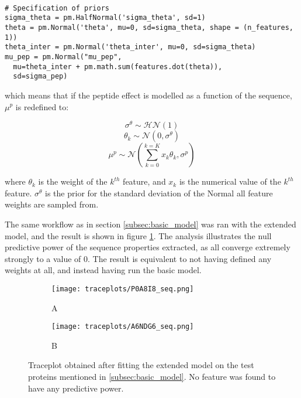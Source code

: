 \begin{verbatim}

# Specification of priors
sigma_theta = pm.HalfNormal('sigma_theta', sd=1)
theta = pm.Normal('theta', mu=0, sd=sigma_theta, shape = (n_features, 1))
theta_inter = pm.Normal('theta_inter', mu=0, sd=sigma_theta)
mu_pep = pm.Normal("mu_pep",
  mu=theta_inter + pm.math.sum(features.dot(theta)),
  sd=sigma_pep)   
\end{verbatim}

which means that if the peptide effect is modelled as a function of the sequence, $\mu^p$ is redefined to:

        
\begin{equation}
\nonumber \sigma^{\theta} \sim \mathcal{HN}(1)
\end{equation}
\begin{equation}
\nonumber \theta_k \sim \mathcal{N}(0, \sigma^{\theta})
\end{equation}
\begin{equation}
\nonumber \mu^p \sim \mathcal{N}(\sum_{k=0}^{k=K}{x_k \theta_k}, \sigma^p)
\end{equation}

where $\theta_k$ is the weight of the $k^{th}$ feature, and $x_k$ is the numerical value of the $k^{th}$ feature. $\sigma^{\theta}$ is the prior for the standard deviation of the Normal all feature weights are sampled from.

The same workflow as in section \ref{subsec:basic_model} was ran with the extended model, and the result is shown in figure \ref{fig:traceplots_seq}. The analysis illustrates the null predictive power of the sequence properties extracted, as all converge extremely strongly to a value of 0. The result is equivalent to not having defined any weights at all, and instead having run the basic model.



\begin{figure}[H]
\begin{subfigure}{\textwidth}
\centering
\caption*{A}
\texttt{[image: traceplots/P0A8I8\_seq.png]}
\end{subfigure}
\bigskip
\begin{subfigure}{\textwidth}
\centering
\caption*{B}
\texttt{[image: traceplots/A6NDG6\_seq.png]}
\end{subfigure}
\caption[Traceplot from sequence modelling of peptide effect]{Traceplot obtained after fitting the extended model on the test proteins mentioned in \ref{subsec:basic_model}. No feature was found to have any predictive power.}
\label{fig:traceplots_seq}
\end{figure}

